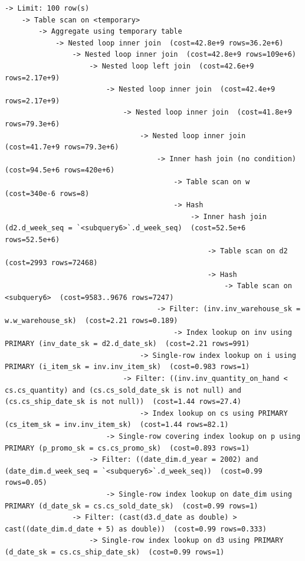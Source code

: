 \documentclass{ULBreport}
\begin{document}
\begin{lstlisting}[caption={Unmaterialised \texttt{EXPLAIN FORMAT=TREE} on SF8 for Query 72 Showing 2.17B-Row Explosion}, label={lst:q72_explain_bad}, basicstyle=\ttfamily\scriptsize, breaklines=true, frame=single]
-> Limit: 100 row(s)
    -> Table scan on <temporary>
        -> Aggregate using temporary table
            -> Nested loop inner join  (cost=42.8e+9 rows=36.2e+6)
                -> Nested loop inner join  (cost=42.8e+9 rows=109e+6)
                    -> Nested loop left join  (cost=42.6e+9 rows=2.17e+9)
                        -> Nested loop inner join  (cost=42.4e+9 rows=2.17e+9)
                            -> Nested loop inner join  (cost=41.8e+9 rows=79.3e+6)
                                -> Nested loop inner join  (cost=41.7e+9 rows=79.3e+6)
                                    -> Inner hash join (no condition)  (cost=94.5e+6 rows=420e+6)
                                        -> Table scan on w  (cost=340e-6 rows=8)
                                        -> Hash
                                            -> Inner hash join (d2.d_week_seq = `<subquery6>`.d_week_seq)  (cost=52.5e+6 rows=52.5e+6)
                                                -> Table scan on d2  (cost=2993 rows=72468)
                                                -> Hash
                                                    -> Table scan on <subquery6>  (cost=9583..9676 rows=7247)
                                    -> Filter: (inv.inv_warehouse_sk = w.w_warehouse_sk)  (cost=2.21 rows=0.189)
                                        -> Index lookup on inv using PRIMARY (inv_date_sk = d2.d_date_sk)  (cost=2.21 rows=991)
                                -> Single-row index lookup on i using PRIMARY (i_item_sk = inv.inv_item_sk)  (cost=0.983 rows=1)
                            -> Filter: ((inv.inv_quantity_on_hand < cs.cs_quantity) and (cs.cs_sold_date_sk is not null) and (cs.cs_ship_date_sk is not null))  (cost=1.44 rows=27.4)
                                -> Index lookup on cs using PRIMARY (cs_item_sk = inv.inv_item_sk)  (cost=1.44 rows=82.1)
                        -> Single-row covering index lookup on p using PRIMARY (p_promo_sk = cs.cs_promo_sk)  (cost=0.893 rows=1)
                    -> Filter: ((date_dim.d_year = 2002) and (date_dim.d_week_seq = `<subquery6>`.d_week_seq))  (cost=0.99 rows=0.05)
                        -> Single-row index lookup on date_dim using PRIMARY (d_date_sk = cs.cs_sold_date_sk)  (cost=0.99 rows=1)
                -> Filter: (cast(d3.d_date as double) > cast((date_dim.d_date + 5) as double))  (cost=0.99 rows=0.333)
                    -> Single-row index lookup on d3 using PRIMARY (d_date_sk = cs.cs_ship_date_sk)  (cost=0.99 rows=1)
\end{lstlisting}
\end{document}
